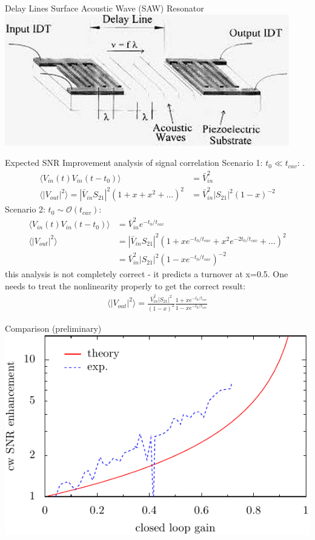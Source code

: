 \documentclass{beamer}
\begin{document}
\begin{frame}{Delay Lines}
{\tiny Surface Acoustic Wave (SAW) Resonator}
\includegraphics[width=\textwidth]{saw}
\end{frame}

\begin{frame}{Expected SNR Improvement}
{\tiny analysis of signal correlation}
Scenario 1: $t_0 \ll t_{cav}$: .
\begin{align*}
\langle V_{in}(t)V_{in}(t-t_0)\rangle &= \bar{V}_{in}^2\\
\langle|V_{out}|^2\rangle = |\bar{V}_{in}S_{21}|^2(1 + x + x^2 + \ldots)^2 &= \bar{V}_{in}^2|S_{21}|^2(1-x)^{-2}
\end{align*}
Scenario 2: $t_0 \sim \mathcal{O}(t_{cav})$:  
\begin{align*}
\langle V_{in}(t)V_{in}(t-t_0)\rangle &= \bar{V}_{in}^2e^{-t_0/t_{cav}}\\
\langle|V_{out}|^2\rangle &=  |\bar{V}_{in}S_{21}|^2(1 + xe^{-t_0/t_{cav}} + x^2e^{-2t_0/t_{cav}} + \ldots)^2 \\
&= \bar{V}_{in}^2|S_{21}|^2(1-xe^{-t_0/t_{cav}})^{-2}
\end{align*}
this analysis is not completely correct - it predicts a turnover at x=0.5. One needs to treat the nonlinearity properly to get the correct result:
\begin{align*}
\langle|V_{out}|^2\rangle = \frac{\bar{V}_{in}^2|S_{21}|^2}{(1-x)^{2}}\frac{1 + xe^{-t_0/t_{cav}}}{1 - xe^{-t_0/t_{cav}}}
\end{align*}
\end{frame}

\begin{frame}{Comparison (preliminary)}
\includegraphics[width=\textwidth]{comparison_xaxis_gain}
\end{frame}
\end{document}
